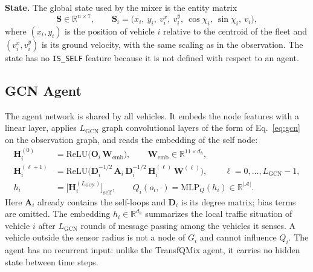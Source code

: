 \textbf{State.} The global state used by the mixer is the entity matrix
\begin{equation}
\label{eq:state-matrix}
\mathbf{S} \in \mathbb{R}^{n\times 7},
\qquad
\mathbf{S}_i = \big(x_i,\ y_i,\ v^{x}_i,\ v^{y}_i,\ \cos\chi_i,\ \sin\chi_i,\ v_i\big),
\end{equation}
where $(x_i,y_i)$ is the position of vehicle $i$ relative to the centroid of the fleet and
$(v^x_i,v^y_i)$ is its ground velocity, with the same scaling as in the observation. The
state has no \texttt{IS\_SELF} feature because it is not defined with respect to an agent.

\subsection{GCN Agent}
\label{subsec:agent}
The agent network is shared by all vehicles. It embeds the node features with a linear
layer, applies $L_{\text{GCN}}$ graph convolutional layers of the form of Eq.~\eqref{eq:gcn}
on the observation graph, and reads the embedding of the self node:
\begin{align}
\label{eq:agent-embed}
\mathbf{H}_i^{(0)} &= \mathrm{ReLU}\big(\mathbf{O}_i\,\mathbf{W}_{\text{emb}}\big),
\qquad \mathbf{W}_{\text{emb}}\in\mathbb{R}^{11\times d_h},\\
\label{eq:agent-gcn}
\mathbf{H}_i^{(\ell+1)} &= \mathrm{ReLU}\Big(\mathbf{D}_i^{-1/2}\,\mathbf{A}_i\,\mathbf{D}_i^{-1/2}\,
\mathbf{H}_i^{(\ell)}\,\mathbf{W}^{(\ell)}\Big),
\qquad \ell = 0,\dots,L_{\text{GCN}}-1,\\
\label{eq:agent-q}
h_i &= \big[\mathbf{H}_i^{(L_{\text{GCN}})}\big]_{\text{self}},
\qquad
Q_i(o_i,\cdot) = \mathrm{MLP}_{Q}(h_i) \in \mathbb{R}^{|\mathcal{A}|}.
\end{align}
Here $\mathbf{A}_i$ already contains the self-loops and $\mathbf{D}_i$ is its degree matrix;
bias terms are omitted. The embedding $h_i\in\mathbb{R}^{d_h}$ summarizes the local traffic
situation of vehicle $i$ after $L_{\text{GCN}}$ rounds of message passing among the
vehicles it senses. A vehicle outside the sensor radius is not a node of $G_i$ and cannot
influence $Q_i$. The agent has no recurrent input: unlike the TransfQMix agent, it carries
no hidden state between time steps.

